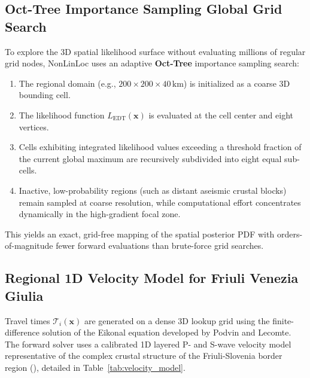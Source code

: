 \subsection{Oct-Tree Importance Sampling Global Grid Search}
To explore the 3D spatial likelihood surface without evaluating millions of regular grid nodes, NonLinLoc uses an adaptive \textbf{Oct-Tree} importance sampling search:
\begin{enumerate}
  \item The regional domain (e.g., $200 \times 200 \times 40\,\mathrm{km}$) is initialized as a coarse 3D bounding cell.
  \item The likelihood function $L_{\mathrm{EDT}}(\mathbf{x})$ is evaluated at the cell center and eight vertices.
  \item Cells exhibiting integrated likelihood values exceeding a threshold fraction of the current global maximum are recursively subdivided into eight equal sub-cells.
  \item Inactive, low-probability regions (such as distant aseismic crustal blocks) remain sampled at coarse resolution, while computational effort concentrates dynamically in the high-gradient focal zone.
\end{enumerate}
This yields an exact, grid-free mapping of the spatial posterior PDF with orders-of-magnitude fewer forward evaluations than brute-force grid searches.

\subsection{Regional 1D Velocity Model for Friuli Venezia Giulia}
Travel times $\mathcal{T}_i(\mathbf{x})$ are generated on a dense 3D lookup grid using the finite-difference solution of the Eikonal equation developed by Podvin and Lecomte. The forward solver uses a calibrated 1D layered P- and S-wave velocity model representative of the complex crustal structure of the Friuli-Slovenia border region (\cite{SMINO}), detailed in Table~\ref{tab:velocity_model}.

